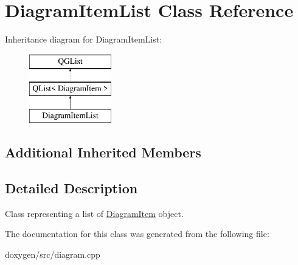 \hypertarget{class_diagram_item_list}{}\section{Diagram\+Item\+List Class Reference}
\label{class_diagram_item_list}
Inheritance diagram for Diagram\+Item\+List\+:\begin{figure}[H]
\begin{center}
\leavevmode
\includegraphics[height=3.000000cm]{class_diagram_item_list}
\end{center}
\end{figure}
\subsection*{Additional Inherited Members}


\subsection{Detailed Description}
Class representing a list of \mbox{\hyperlink{class_diagram_item}{Diagram\+Item}} object. 

The documentation for this class was generated from the following file\+:\begin{DoxyCompactItemize}
\item 
doxygen/src/diagram.\+cpp\end{DoxyCompactItemize}

